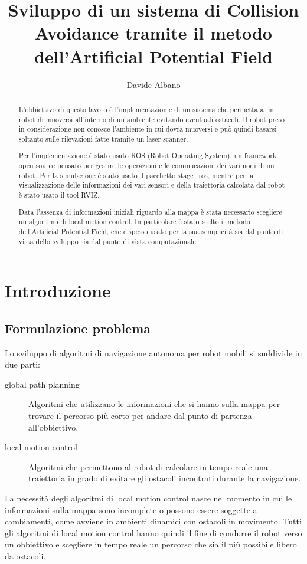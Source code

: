 \documentclass[Lau, binding=0.6cm, oneside]{sapthesis}
\title{Sviluppo di un sistema di Collision Avoidance tramite il metodo dell'Artificial Potential Field}
\author{Davide Albano}
\begin{document}
\maketitle
\begin{abstract}
L'obbiettivo di questo lavoro è l'implementazionie di un sistema che permetta a un robot di muoversi all'interno di un ambiente evitando eventuali ostacoli.
Il robot preso in considerazione non conosce l'ambiente in cui dovrà muoversi e può quindi basarsi soltanto sulle rilevazioni fatte tramite un laser scanner.

Per l'implementazione è stato usato ROS (Robot Operating System), un framework open source pensato per gestire le operazioni e le cominucazioni dei vari nodi di un robot.
Per la simulazione è stato usato il pacchetto stage\_ros, mentre per la visualizzazione delle informazioni dei vari sensori e della traiettoria calcolata dal robot è stato usato il tool RVIZ.

Data l'assenza di informazioni iniziali riguardo alla mappa è stata necessario scegliere un algoritmo di local motion control.
In particolare è stato scelto il metodo dell'Artificial Potential Field, che è spesso usato per la sua semplicità sia dal punto di vista dello sviluppo sia dal punto di vista computazionale.
\end{abstract}
\tableofcontents

\chapter{Introduzione}
\section{Formulazione problema}
Lo sviluppo di algoritmi di navigazione autonoma per robot mobili si suddivide in due parti\cite{fonte1}:
\begin{description}
	\item[global path planning] Algoritmi che utilizzano le informazioni che si hanno sulla mappa per trovare il percorso più corto per andare dal punto di partenza all'obbiettivo.
	\item[local motion control] Algoritmi che permettono al robot di calcolare in tempo reale una traiettoria in grado di evitare gli ostacoli incontrati durante la navigazione.
\end{description}

La necessità degli algoritmi di local motion control nasce nel momento in cui le informazioni sulla mappa sono incomplete o possono essere soggette a cambiamenti, come avviene in ambienti dinamici con ostacoli in movimento.
Tutti gli algoritmi di local motion control hanno quindi il fine di condurre il robot verso un obbiettivo e scegliere in tempo reale un percorso che sia il più possibile libero da ostacoli.
\end{document}
